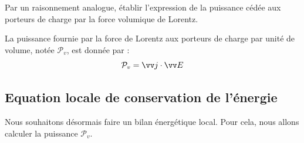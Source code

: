 \documentclass[11pt,fleqn]{book} %
\begin{document}
\begin{capex}
	Par un raisonnement analogue, établir l'expression de la puissance cédée aux porteurs de charge par la force volumique de Lorentz.
\end{capex}

\begin{theorem}
	La puissance fournie par la force de Lorentz aux porteurs de charge par unité de volume, notée $\mathcal{P}_v$, est donnée par :
	\begin{equation}
		\mathcal{P}_v = \vv j \cdot \vv E
	\end{equation}
\end{theorem}

\subsection{Equation locale de conservation de l'énergie}

Nous souhaitons désormais faire un bilan énergétique local. Pour cela, nous allons calculer la puissance $\mathcal{P}_v$.
\end{document}
